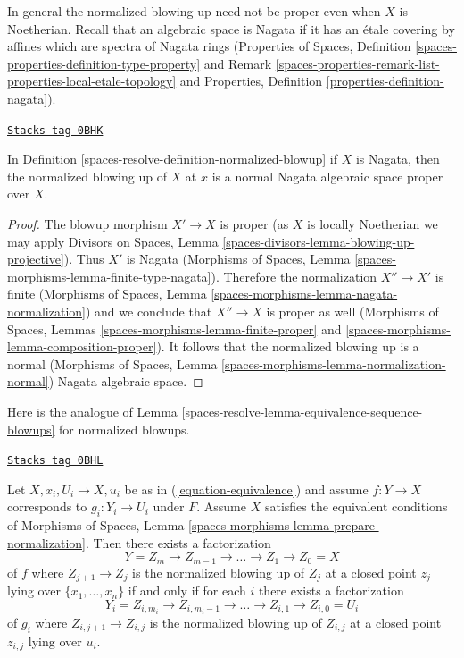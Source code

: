 \medskip\noindent
In general the normalized blowing up need not be proper even
when $X$ is Noetherian. Recall that an algebraic space is Nagata if it
has an \'etale covering by affines which are spectra of Nagata rings
(Properties of Spaces, Definition
\ref{spaces-properties-definition-type-property} and
Remark \ref{spaces-properties-remark-list-properties-local-etale-topology} and
Properties, Definition \ref{properties-definition-nagata}).

\begin{lemma}
\label{spaces-resolve-lemma-Nagata-normalized-blowup}
\href{https://stacks.math.columbia.edu/tag/0BHK}{\texttt{Stacks tag 0BHK}}

In Definition \ref{spaces-resolve-definition-normalized-blowup} if $X$ is Nagata,
then the normalized blowing up of $X$ at $x$ is a
normal Nagata algebraic space proper over $X$.
\end{lemma}

\begin{proof}
The blowup morphism $X' \to X$ is proper
(as $X$ is locally Noetherian we may apply
Divisors on Spaces, Lemma \ref{spaces-divisors-lemma-blowing-up-projective}).
Thus $X'$ is Nagata
(Morphisms of Spaces, Lemma \ref{spaces-morphisms-lemma-finite-type-nagata}).
Therefore the normalization $X'' \to X'$ is finite
(Morphisms of Spaces, Lemma \ref{spaces-morphisms-lemma-nagata-normalization})
and we conclude that $X'' \to X$ is proper as well
(Morphisms of Spaces, Lemmas \ref{spaces-morphisms-lemma-finite-proper} and
\ref{spaces-morphisms-lemma-composition-proper}).
It follows that the normalized blowing up
is a normal (Morphisms of Spaces, Lemma
\ref{spaces-morphisms-lemma-normalization-normal})
Nagata algebraic space.
\end{proof}

Here is the analogue of
Lemma \ref{spaces-resolve-lemma-equivalence-sequence-blowups}
for normalized blowups.

\begin{lemma}
\label{spaces-resolve-lemma-equivalence-sequence-normalized-blowups}
\href{https://stacks.math.columbia.edu/tag/0BHL}{\texttt{Stacks tag 0BHL}}

Let $X, x_i, U_i \to X, u_i$ be as in (\ref{equation-equivalence})
and assume $f : Y \to X$ corresponds to $g_i : Y_i \to U_i$ under $F$.
Assume $X$ satisfies the equivalent conditions of
Morphisms of Spaces, Lemma \ref{spaces-morphisms-lemma-prepare-normalization}.
Then there exists a factorization
$$
Y = Z_m \to Z_{m - 1} \to \ldots \to Z_1 \to Z_0 = X
$$
of $f$ where $Z_{j + 1} \to Z_j$ is the normalized blowing up of $Z_j$
at a closed point $z_j$ lying over $\{x_1, \ldots, x_n\}$ if and only if
for each $i$ there exists a factorization
$$
Y_i = Z_{i, m_i} \to Z_{i, m_i - 1} \to \ldots \to Z_{i, 1} \to Z_{i, 0} = U_i
$$
of $g_i$ where $Z_{i, j + 1} \to Z_{i, j}$ is the normalized blowing up of
$Z_{i, j}$ at a closed point $z_{i, j}$ lying over $u_i$.
\end{lemma}

